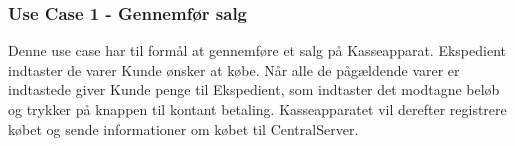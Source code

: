 \subsubsection{Use Case 1 - Gennemfør salg}
Denne use case har til formål at gennemføre et salg på Kasseapparat.
Ekspedient indtaster de varer Kunde ønsker at købe. Når alle de pågældende varer er indtastede giver Kunde penge til Ekspedient, som indtaster det modtagne beløb og trykker på knappen til kontant betaling. Kasseapparatet vil derefter registrere købet og sende informationer om købet til CentralServer.